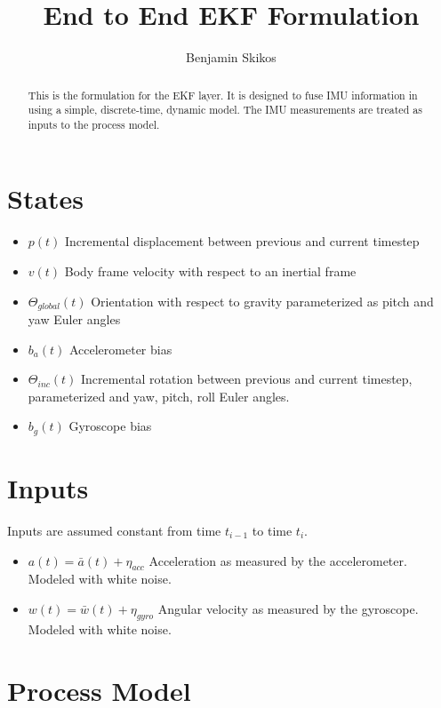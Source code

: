 \documentclass[]{article}
\title{End to End EKF Formulation}
\author{Benjamin Skikos}
\begin{document}
\maketitle

\begin{abstract}
This is the formulation for the EKF layer. It is designed to fuse IMU information in using a simple, discrete-time, dynamic model. The IMU measurements are treated as inputs to the process model.
\end{abstract}

\section{States}

\begin{itemize}
	\item $p(t)$ Incremental displacement between previous and current timestep
	\item $v(t)$ Body frame velocity with respect to an inertial frame
	\item $\Theta_{global}(t)$ Orientation with respect to gravity parameterized as pitch and yaw Euler angles 
	\item $b_a(t)$ Accelerometer bias
	\item $\Theta_{inc}(t)$ Incremental rotation between previous and current timestep, parameterized and yaw, pitch, roll Euler angles.
	\item $b_g(t)$ Gyroscope bias
\end{itemize}

\section{Inputs}

Inputs are assumed constant from time $t_{i-1}$ to time $t_i$.

\begin{itemize}
	\item $a(t) = \bar{a}(t) + \eta_{acc}$ Acceleration as measured by the accelerometer. Modeled with white noise.
	\item $w(t) = \bar{w}(t) + \eta_{gyro}$ Angular velocity as measured by the gyroscope. Modeled with white noise.
\end{itemize}

\section{Process Model}
\end{document}
